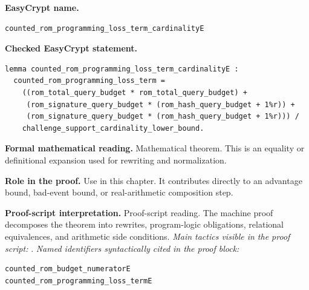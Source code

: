 \begin{formaltheorem}
\noindent\textbf{EasyCrypt name.}
\begin{lstlisting}[language=EasyCrypt,basicstyle=\ttfamily\scriptsize]
counted_rom_programming_loss_term_cardinalityE
\end{lstlisting}
\noindent\textbf{Checked EasyCrypt statement.}
\begin{lstlisting}[language=EasyCrypt,basicstyle=\ttfamily\scriptsize]
lemma counted_rom_programming_loss_term_cardinalityE :
  counted_rom_programming_loss_term =
    ((rom_total_query_budget * rom_total_query_budget) +
     (rom_signature_query_budget * (rom_hash_query_budget + 1%r)) +
     (rom_signature_query_budget * (rom_hash_query_budget + 1%r))) /
    challenge_support_cardinality_lower_bound.
\end{lstlisting}
\noindent\textbf{Formal mathematical reading.}
Mathematical theorem. This is an equality or definitional expansion used for rewriting and normalization.

\noindent\textbf{Role in the proof.}
Use in this chapter. It contributes directly to an advantage bound, bad-event bound, or real-arithmetic composition step.

\noindent\textbf{Proof-script interpretation.}
Proof-script reading. The machine proof decomposes the theorem into rewrites, program-logic obligations, relational equivalences, and arithmetic side conditions.
\emph{Main tactics visible in the proof script:} .
\emph{Named identifiers syntactically cited in the proof block:}
\begin{lstlisting}[language=EasyCrypt,basicstyle=\ttfamily\scriptsize]
counted_rom_budget_numeratorE
counted_rom_programming_loss_termE
\end{lstlisting}

\end{formaltheorem}

